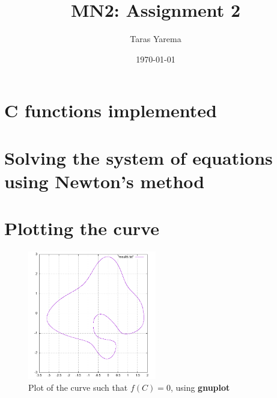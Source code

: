\documentclass[12pt]{article}
\title{MN2: Assignment 2}
\author{Taras Yarema}
\date{\today}
\begin{document}
\maketitle

\section{C functions implemented}

\cite{MN2:1}

\section{Solving the system of equations using Newton's method}

\section{Plotting the curve}

\begin{figure}[h]
    \centering
    \includegraphics[width=0.5\textwidth]{got}
    \caption{Plot of the curve such that $f(C) = 0$, using \textbf{gnuplot}}
\end{figure}



\end{document}
